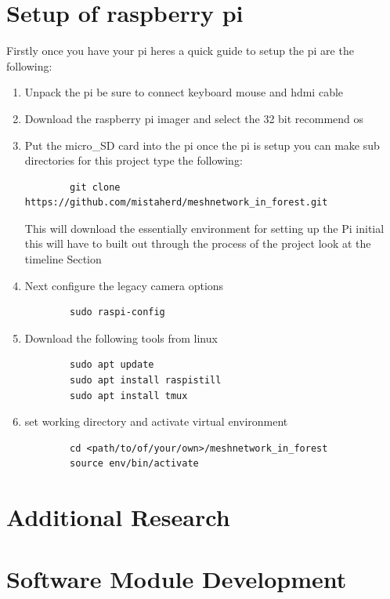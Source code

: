 \section{Setup of raspberry pi}
Firstly once you have  your pi  heres  a  quick  guide to setup the pi are  the following:
\begin{enumerate}
    \item Unpack the  pi be sure  to  connect keyboard mouse  and hdmi cable
    \item Download the  raspberry pi imager and  select the  32 bit  recommend os 
    \item Put the  micro\_SD card  into  the pi once the  pi is  setup you can make sub directories for this project type the  following:
    \begin{verbatim}
        git clone https://github.com/mistaherd/meshnetwork_in_forest.git
    \end{verbatim}
    This  will download the  essentially  environment for  setting up the  Pi  initial this will have to built out  through the  process of  the   project look at the timeline Section
    \item Next configure the legacy camera  options
    \begin{verbatim}
        sudo raspi-config
    \end{verbatim}
    \item Download the following tools from linux
    \begin{verbatim}
        sudo apt update
        sudo apt install raspistill
        sudo apt install tmux
    \end{verbatim}
    \item set working directory and activate  virtual environment
    \begin{verbatim}
        cd <path/to/of/your/own>/meshnetwork_in_forest
        source env/bin/activate
    \end{verbatim}
\end{enumerate}
\section{Additional  Research}

\section{Software Module Development}

\newpage

